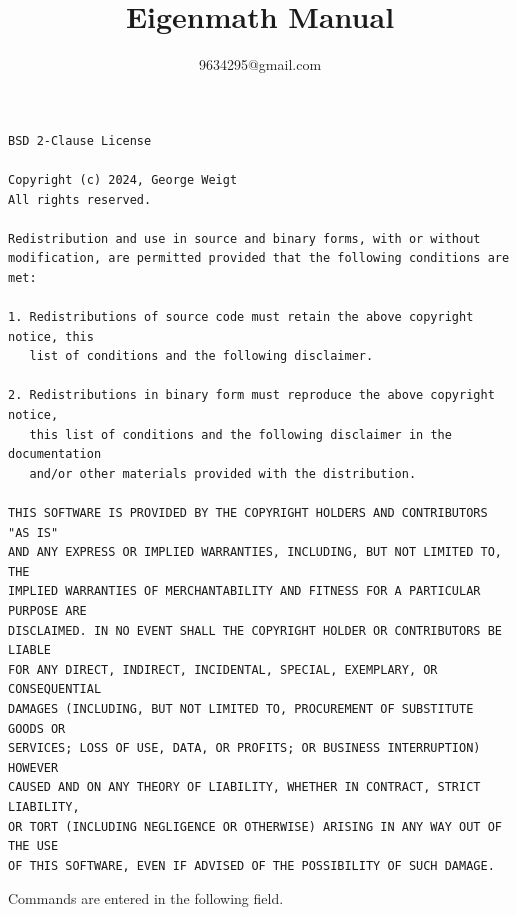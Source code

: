\documentclass[12pt]{article}
\title{Eigenmath Manual}
\author{9634295@gmail.com}
\date{}
\begin{document}
\newpage
\maketitle
\newpage
\tableofcontents
\newpage
{\footnotesize\begin{verbatim}
BSD 2-Clause License

Copyright (c) 2024, George Weigt
All rights reserved.

Redistribution and use in source and binary forms, with or without
modification, are permitted provided that the following conditions are met:

1. Redistributions of source code must retain the above copyright notice, this
   list of conditions and the following disclaimer.

2. Redistributions in binary form must reproduce the above copyright notice,
   this list of conditions and the following disclaimer in the documentation
   and/or other materials provided with the distribution.

THIS SOFTWARE IS PROVIDED BY THE COPYRIGHT HOLDERS AND CONTRIBUTORS "AS IS"
AND ANY EXPRESS OR IMPLIED WARRANTIES, INCLUDING, BUT NOT LIMITED TO, THE
IMPLIED WARRANTIES OF MERCHANTABILITY AND FITNESS FOR A PARTICULAR PURPOSE ARE
DISCLAIMED. IN NO EVENT SHALL THE COPYRIGHT HOLDER OR CONTRIBUTORS BE LIABLE
FOR ANY DIRECT, INDIRECT, INCIDENTAL, SPECIAL, EXEMPLARY, OR CONSEQUENTIAL
DAMAGES (INCLUDING, BUT NOT LIMITED TO, PROCUREMENT OF SUBSTITUTE GOODS OR
SERVICES; LOSS OF USE, DATA, OR PROFITS; OR BUSINESS INTERRUPTION) HOWEVER
CAUSED AND ON ANY THEORY OF LIABILITY, WHETHER IN CONTRACT, STRICT LIABILITY,
OR TORT (INCLUDING NEGLIGENCE OR OTHERWISE) ARISING IN ANY WAY OUT OF THE USE
OF THIS SOFTWARE, EVEN IF ADVISED OF THE POSSIBILITY OF SUCH DAMAGE.
\end{verbatim}}
\newpage

Commands are entered in the following field.

\begin{center}
\end{center}
\end{document}

